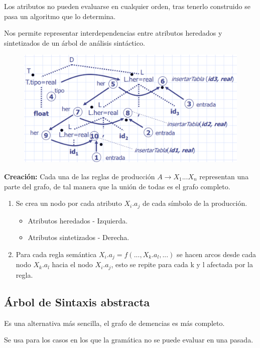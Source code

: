 \documentclass[12pt]{report} %
\begin{document}
Los atributos no pueden evaluarse en cualquier orden, tras tenerlo construido se pasa un algoritmo que lo determina.

Nos permite representar interdependencias entre atributos heredados y sintetizados de un árbol de análisis sintáctico.

\begin{figure}[H]
  {\includegraphics[scale=.25]{2021-05-01 01_15_15-05_resum_Sem_2021.pdf - Foxit Reader.png}}
\end{figure}

\textbf{Creación:} Cada una de las reglas de producción $A \rightarrow X_1 ... X_n$ representan una parte del grafo, de tal manera que la unión de todas es el grafo completo.
\begin{enumerate}
  \item Se crea un nodo por cada atributo $X_i.a_j$ de cada símbolo de la producción.
  \begin{itemize}
    \item Atributos heredados - Izquierda.
    \item Atributos sintetizados - Derecha.
  \end{itemize}
  \item Para cada regla semántica $X_i.a_j = f(...,X_k.a_l, ...)$ se hacen arcos desde cada nodo $X_k.a_l$ hacia el nodo $X_i.a_j$, esto se repite para cada k y l afectada por la regla.
\end{enumerate}
\pagebreak
\subsection{Árbol de Sintaxis abstracta}
Es una alternativa más sencilla, el grafo de demencias es más completo.

Se usa para los casos en los que la gramática no se puede evaluar en una pasada.
\end{document}
